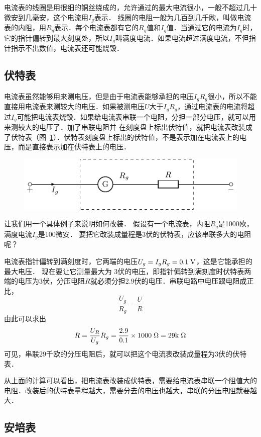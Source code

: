 电流表的线圈是用很细的铜丝绕成的，允许通过的最大电流很小，一般不超过几十微安到几毫安，这个电流用$I_g$表示．
线圈的电阻一般为几百到几千欧，叫做电流表的内阻，用$R_g$表示．每个电流表都有它的$R_g$值和$I_g$值．当通过它的电流为$I_g$时，它的指针偏转到最大刻度处，所以$I_g$叫满度电流．如果电流超过满度电流，不但指针指示不出数值，电流表还可能烧毁．

\subsection{伏特表}


电流表虽然能够用来测电压，但是由于电流表能够承担的电压$I_gR_g$很小，所以不能直接用电流表来测较大的电压．如果被测电压$U$大于$I_gR_g$，通过电流表的电流将超过$I_g$可能把电流表烧毁．如果给电流表串联一个电阻，分担一部分电压，就可以用来测较大的电压了．加了串联电阻并
在刻度盘上标出伏特值，就把电流表改装成了伏特表（图~\ref{fig_B_7-16}）．伏特表刻度盘上标出的伏特值，不是表示加在电流表上的电压，而是直接表示加在伏特表上的电压．
\begin{figure}[htbp]
    \centering
    \includegraphics{fig/B/7-16.pdf}
    \caption{}\label{fig_B_7-16}
\end{figure}

让我们用一个具体例子来说明如何改装．
假设有一个电流表，内阻$R_g$是1000欧，满度电流$I_g$是100微安．
要把它改装成量程是3伏的伏特表，应该串联多大的电阻呢？

电流表指针偏转到满刻度时，它两端的电压$U_g=I_gR_g=0.1\;\text{V}$，这是它能承担的最大电压．
现在要让它测量最大为
3伏的电压，即指针偏转到满刻度时伏特表两端的电压为3伏，分压电阻$R$就必须分担2.9伏的电压．串联电路中电压跟电阻成正比，
\[\frac{U_g}{R_g}=\frac{U}{R}\]
由此可以求出
\[R=\frac{U_R}{U_g}R_g=\frac{2.9}{0.1}\times 1000\;\Omega=29{\rm k}\;\Omega\]
可见，串联29千欧的分压电阻后，就可以把这个电流表改装成量程为3伏的伏特表．

从上面的计算可以看出，把电流表改装成伏特表，需要给电流表串联一个阻值大的电阻．改装后的伏特表量程越大，需要分去的电压也越大，串联的分压电阻就要越大．

\subsection{安培表}


